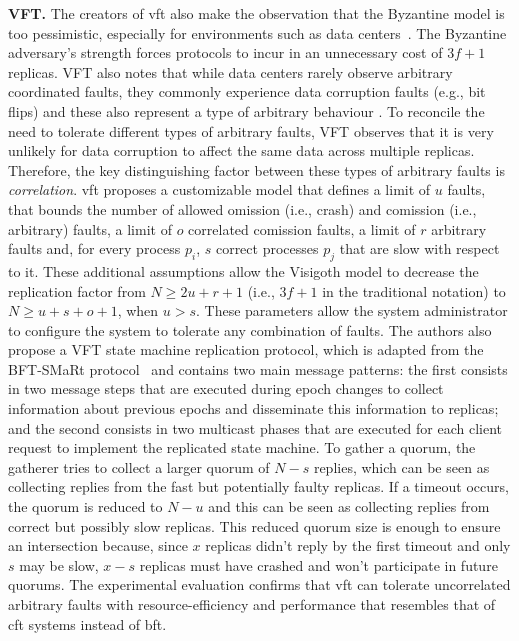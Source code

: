 \textbf{VFT.} The creators of \acrfull{vft} also make the observation that the Byzantine model is too pessimistic, especially for environments such as data centers~\cite{Porto2015}. The Byzantine adversary's strength forces protocols to incur in an unnecessary cost of $3f+1$ replicas. VFT also notes that while data centers rarely observe arbitrary coordinated faults, they commonly experience data corruption faults (e.g., bit flips) and these also represent a type of arbitrary behaviour \cite{AmazonS31,AmazonS32}. To reconcile the need to tolerate different types of arbitrary faults, VFT observes that it is very unlikely for data corruption to affect the same data across multiple replicas. Therefore, the key distinguishing factor between these types of arbitrary faults is \textit{correlation}. \acrshort{vft} proposes a customizable model that defines a limit of $u$ faults, that bounds the number of allowed omission (i.e., crash) and comission (i.e., arbitrary) faults, a limit of $o$ correlated comission faults, a limit of $r$ arbitrary faults and, for every process $p_i$, $s$ correct processes $p_j$ that are slow with respect to it. These additional assumptions allow the Visigoth model to decrease the replication factor from $N \geq 2u+r+1$ (i.e., $3f+1$ in the traditional notation) to $N \geq u+s+o+1$, when $u > s$. These parameters allow the system administrator to configure the system to tolerate any combination of faults. The authors also propose a VFT state machine replication protocol, which is adapted from the BFT-SMaRt protocol~\cite{Bessani:2014} and contains two main message patterns: the first consists in two message steps that are executed during epoch changes to collect information about previous epochs and disseminate this information to replicas; and the second consists in two multicast phases that are executed for each client request to implement the replicated state machine. To gather a quorum, the gatherer tries to collect a larger quorum of $N-s$ replies, which can be seen as collecting replies from the fast but potentially faulty replicas. If a timeout occurs, the quorum is reduced to $N-u$ and this can be seen as collecting replies from correct but possibly slow replicas. This reduced quorum size is enough to ensure an intersection because, since $x$ replicas didn't reply by the first timeout and only $s$ may be slow, $x-s$ replicas must have crashed and won't participate in future quorums. The experimental evaluation confirms that \acrshort{vft} can tolerate uncorrelated arbitrary faults with resource-efficiency and performance that resembles that of \acrshort{cft} systems instead of \acrshort{bft}. \par
